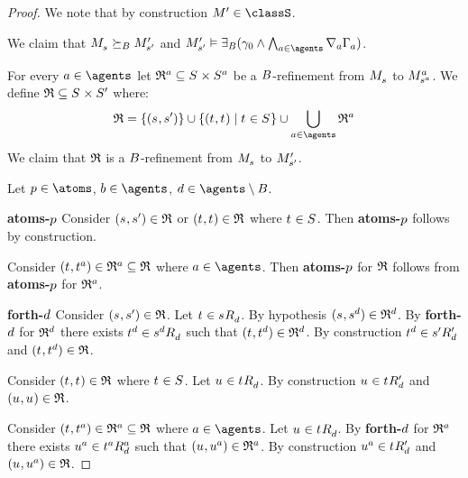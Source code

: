 \begin{proof}
We note that by construction $\kModelP \in \classS$.

We claim that $\kPModel{\kStateS} \simulatesBs \kPModelP{\kStateSP}$ and $\kPModelP{\kStateSP} \entails \somerefsBs (\gamma_0 \land \bigwedge_{\agentA \in \agents} \coversA \Gamma_\agentA)$.

For every $\agentA \in \agents$ let $\refinement^\agentA \subseteq \kStates \times \kStates[\agentA]$ be a $\agentsB$-refinement from $\kPModel{\kStateS}$ to $\kPModel[\agentA]{\kStateS[\agentA]}$.
We define $\refinement \subseteq \kStates \times \kStatesP$ where:
$$
\refinement = \{(\kStateS, \kStateSP)\} \cup \{(\kStateT, \kStateT) \mid \kStateT \in \kStates\} \cup \bigcup_{\agentA \in \agents} \refinement^\agentA
$$
We claim that $\refinement$ is a $\agentsB$-refinement from $\kPModel{\kStateS}$ to $\kPModelP{\kStateSP}$.

Let $\atomP \in \atoms$, $\agentB \in \agents$, $\agentD \in \agents \setminus \agentsB$.

{\bf atoms-$\atomP$}
Consider $(\kStateS, \kStateSP) \in \refinement$ or $(\kStateT, \kStateT) \in \refinement$ where $\kStateT \in \kStates$.
Then {\bf atoms-$\atomP$} follows by construction.

Consider $(\kStateT, \kStateT[\agentA]) \in \refinement^\agentA \subseteq \refinement$ where $\agentA \in \agents$.
Then {\bf atoms-$\atomP$} for $\refinement$ follows from {\bf atoms-$\atomP$} for $\refinement^\agentA$.

{\bf forth-$\agentD$}
Consider $(\kStateS, \kStateSP) \in \refinement$.
Let $\kStateT \in \kSuccessorsD{\kStateS}$.
By hypothesis $(\kStateS, \kStateS[\agentD]) \in \refinement^\agentD$.
By {\bf forth-$\agentD$} for $\refinement^\agentD$ there exists $\kStateT[\agentD] \in \kSuccessorsD{\kStateS[\agentD]}$ such that $(\kStateT, \kStateT[\agentD]) \in \refinement^\agentD$.
By construction $\kStateT[\agentD] \in \kSuccessorsPD{\kStateSP}$ and $(\kStateT, \kStateT[\agentD]) \in \refinement$.

Consider $(\kStateT, \kStateT) \in \refinement$ where $\kStateT \in \kStates$.
Let $\kStateU \in \kSuccessorsD{\kStateT}$.
By construction $\kStateU \in \kSuccessorsPD{\kStateT}$ and $(\kStateU, \kStateU) \in \refinement$.

Consider $(\kStateT, \kStateT[\agentA]) \in \refinement^\agentA \subseteq \refinement$ where $\agentA \in \agents$.
Let $\kStateU \in \kSuccessorsD{\kStateT}$.
By {\bf forth-$\agentD$} for $\refinement^\agentA$ there exists $\kStateU[\agentA] \in \kSuccessorsD[\agentA]{\kStateT[\agentA]}$ such that $(\kStateU, \kStateU[\agentA]) \in \refinement^\agentA$.
By construction $\kStateU[\agentA] \in \kSuccessorsPD{\kStateT}$ and $(\kStateU, \kStateU[\agentA]) \in \refinement$.


\end{proof}
